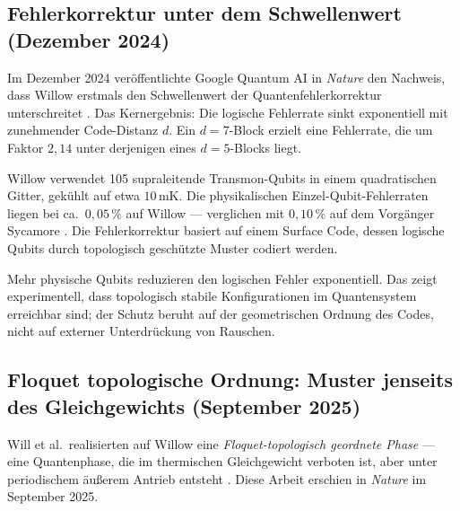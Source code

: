 \subsection{Fehlerkorrektur unter dem Schwellenwert (Dezember 2024)}

Im Dezember 2024 veröffentlichte Google Quantum AI in \textit{Nature} den Nachweis,
dass Willow erstmals den Schwellenwert der Quantenfehlerkorrektur unterschreitet
\cite{GoogleWillow2024}. Das Kernergebnis: Die logische Fehlerrate sinkt
exponentiell mit zunehmender Code-Distanz $d$. Ein $d=7$-Block erzielt eine
Fehlerrate, die um Faktor $2{,}14$ unter derjenigen eines $d=5$-Blocks liegt.

Willow verwendet 105 supraleitende Transmon-Qubits in einem quadratischen Gitter,
gekühlt auf etwa $10\,\text{mK}$. Die physikalischen Einzel-Qubit-Fehlerraten
liegen bei ca.\ $0{,}05\,\%$ auf Willow — verglichen mit $0{,}10\,\%$ auf dem
Vorgänger Sycamore \cite{Will2025PubMed}. Die Fehlerkorrektur basiert auf einem
Surface Code, dessen logische Qubits durch topologisch geschützte Muster codiert
werden.

\begin{keypoint}
Mehr physische Qubits reduzieren den logischen Fehler exponentiell. Das zeigt
experimentell, dass topologisch stabile Konfigurationen im Quantensystem
erreichbar sind; der Schutz beruht auf der geometrischen Ordnung des Codes,
nicht auf externer Unterdrückung von Rauschen.
\end{keypoint}

\subsection{Floquet topologische Ordnung: Muster jenseits des Gleichgewichts
(September 2025)}

Will et al.\ realisierten auf Willow eine \emph{Floquet-topologisch geordnete Phase}
— eine Quantenphase, die im thermischen Gleichgewicht verboten ist, aber unter
periodischem äußerem Antrieb entsteht \cite{Will2025Nature}. Diese Arbeit erschien
in \textit{Nature} im September 2025.


